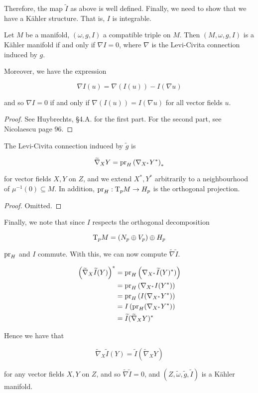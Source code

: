 \documentclass{article}
\renewcommand{\tilde}{\widetilde}
\begin{document}
Therefore, the map \(\tilde I\) as above is well defined. Finally, we need to show that we have a K\"ahler structure. That is, \(I\) is integrable.

\begin{lemma*}
    Let \(M\) be a manifold, \((\omega, g, I)\) a compatible triple on \(M\). Then \((M, \omega, g, I)\) is a K\"ahler manifold if and only if \(\nabla I = 0\), where \(\nabla\) is the Levi-Civita connection induced by \(g\).

    Moreover, we have the expression

    \[\nabla I(u) = \nabla(I(u)) - I(\nabla u)\]

    and so \(\nabla I = 0\) if and only if \(\nabla(I(u)) = I(\nabla u)\) for all vector fields \(u\).
\end{lemma*}

\begin{proof}
    See Huybrechts, \S 4.A. for the first part. For the second part, see Nicolaescu page 96.
\end{proof}

\begin{lemma*}
    The Levi-Civita connection induced by \(\tilde g\) is

    \[\tilde\nabla_XY = \pr_H\left(\nabla_{X^*}Y^*\right)_*\]

    for vector fields \(X, Y\) on \(Z\), and we extend \(X^*, Y^*\) arbitrarily to a neighbourhood of \(\mu^{-1}(0) \subseteq M\). In addition, \(\operatorname{pr}_H : \mathrm{T}_p M \to H_p\) is the orthogonal projection.
\end{lemma*}

\begin{proof}
    Omitted.
\end{proof}

Finally, we note that since \(I\) respects the orthogonal decomposition

\[\mathrm{T}_pM = \left(N_p \oplus V_p\right) \oplus H_p\]

\(\operatorname{pr}_H\) and \(I\) commute. With this, we can now compute \(\tilde\nabla\tilde I\).


\begin{align*}
    \left(\tilde\nabla_X\tilde I(Y)\right)^* &= \pr_H\left(\nabla_{X^*}\tilde I(Y)^*)\right) \\
    &= \pr_H\left(\nabla_{X^*}I(Y^*)\right)\\
    &= \pr_H\left(I(\nabla_{X^*}Y^*)\right) \\
    &= I\left(\pr_H(\nabla_{X^*}Y^*)\right) \\
    &= \tilde I(\tilde\nabla_XY)^*
\end{align*}

Hence we have that

\[\tilde\nabla_X\tilde I(Y) = \tilde I(\tilde\nabla_XY)\]

for any vector fields \(X, Y\) on \(Z\), and so \(\tilde\nabla\tilde I = 0\), and \((Z, \tilde\omega, \tilde g, \tilde I)\) is a K\"ahler manifold.
\end{document}
